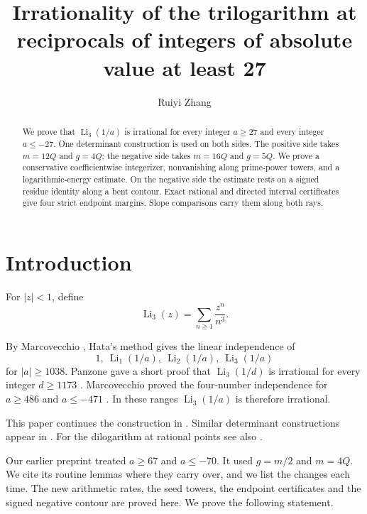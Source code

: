 \documentclass{amsart}
\theoremstyle{remark}
\numberwithin{equation}{section}
\numberwithin{table}{section}
\begin{document}
\title[Irrationality of $\operatorname{Li}_3(1/a)$ for $|a|\ge27$]{Irrationality of the trilogarithm at reciprocals of integers of absolute value at least 27}
\author{Ruiyi Zhang}
\address{Independent Researcher, Columbia, Maryland, USA}

\begin{abstract}
We prove that $\operatorname{Li}_3(1/a)$ is irrational for every integer
$a\ge27$ and every integer $a\le-27$. One determinant construction is used
on both sides. The positive side takes $m=12Q$ and $g=4Q$; the negative side
takes $m=16Q$ and $g=5Q$. We prove a conservative coefficientwise
integerizer, nonvanishing along prime-power towers, and a
logarithmic-energy estimate. On the negative side the estimate rests on a
signed residue identity along a bent contour. Exact rational and directed
interval certificates give four strict endpoint margins. Slope comparisons
carry them along both rays.
\end{abstract}

\maketitle

\section{Introduction}

For $|z|<1$, define
\[
\operatorname{Li}_3(z)=\sum_{n\ge1}\frac{z^n}{n^3}.
\]

By Marcovecchio \cite[p.~229]{Marcovecchio}, Hata's method
\cite[Corollary~2.2]{Hata} gives the linear independence of
\[
1,\ \operatorname{Li}_1(1/a),\ \operatorname{Li}_2(1/a),\
\operatorname{Li}_3(1/a)
\]
for $|a|\ge1038$. Panzone gave a short proof that
$\operatorname{Li}_3(1/d)$ is irrational for every integer $d\ge1173$
\cite[Theorem~2, p.~108]{Panzone}. Marcovecchio proved the four-number
independence for $a\ge486$ and $a\le-471$ \cite[Theorem~7.1,
pp.~228--229]{Marcovecchio}. In these ranges $\operatorname{Li}_3(1/a)$ is
therefore irrational.

This paper continues the construction in \cite{Zh,ZhB}. Similar determinant constructions appear
in \cite{Fauzan,Lai}. For the dilogarithm at rational points see also
\cite{Prellberg,Liu,TanZhang}.

Our earlier preprint \cite{ZhB} treated $a\ge67$ and $a\le-70$. It used
$g=m/2$ and $m=4Q$. We cite its routine lemmas where they carry over, and we
list the changes each time. The new arithmetic rates, the seed towers, the
endpoint certificates and the signed negative contour are proved here. We
prove the following statement.
\end{document}
